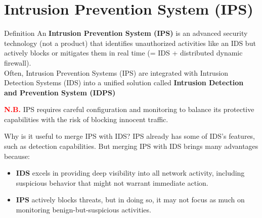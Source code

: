 \section{Intrusion Prevention System (IPS)}
\vspace{0.2cm}
\begin{quotebox-yellow}{Definition}
An \textbf{Intrusion Prevention System (IPS)} is an advanced security technology (not a product) that identifies unauthorized activities like an IDS but actively blocks or mitigates them in real time (= IDS + distributed dynamic firewall).\\ Often, Intrusion Prevention Systems (IPS) are integrated with Intrusion Detection Systems (IDS) into a unified solution called \textbf{Intrusion Detection and Prevention System (IDPS)}
\end{quotebox-yellow}
\noindent
\textcolor{red}{\textbf{N.B.}} IPS requires careful configuration and monitoring to balance its protective capabilities with the risk of blocking innocent traffic.
\begin{center}
\begin{quotebox-red}{Why is it useful to merge IPS with IDS?}
    IPS already has some of IDS's features, such as detection capabilities. But merging IPS with IDS brings many advantages because:
    \begin{itemize}
        \item \textbf{IDS} excels in providing deep visibility into all network activity, including suspicious behavior that might not warrant immediate action.
        \item \textbf{IPS} actively blocks threats, but in doing so, it may not focus as much on monitoring benign-but-suspicious activities.
    \end{itemize}
\end{quotebox-red}
\end{center}










